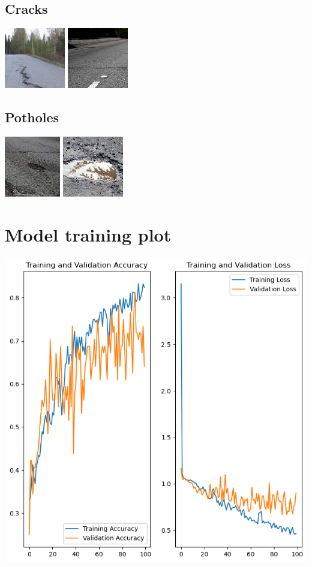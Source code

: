 \documentclass[12pt, letterpaper, twoside]{article}
\begin{document}
\subsection{Cracks}
\includegraphics{rd1_3.jpg}
\includegraphics{rd2_2.jpg}

\subsection{Potholes}
\includegraphics{rd2_5.jpg}
\includegraphics{rd3_9.jpg}

\section{Model training plot}
\label{app:model_plot}

\includegraphics{model_plot.png}
\end{document}
